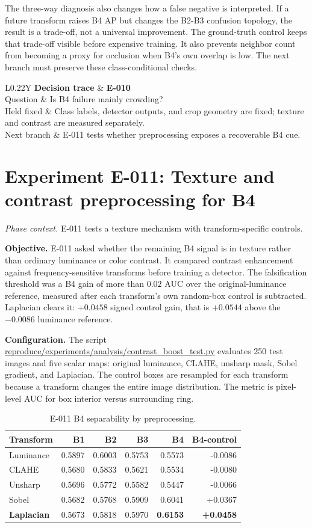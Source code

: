 \documentclass[preprint,12pt]{elsarticle}
\newcommand{\pathcode}[1]{\scriptsize\url{#1}}
\newcommand{\experiment}[2]{\par\medskip\Needspace{7\baselineskip}\section{Experiment #1: #2}}
\newcommand{\decisioncard}[4]{%
\begin{table}[H]\centering\small
\begin{tabularx}{\columnwidth}{L{0.22\columnwidth}Y}
\toprule
\textbf{Decision trace} & \textbf{#1}\\
Question & #2\\
Held fixed & #3\\
Next branch & #4\\
\bottomrule
\end{tabularx}
\end{table}}
\newcommand{\phasecontext}[1]{%
\par\smallskip\noindent\textit{Phase context.} #1\par\smallskip}
\begin{document}
The three-way diagnosis also changes how a false negative is interpreted. If a
future transform raises B4 AP but changes the B2-B3 confusion topology, the
result is a trade-off, not a universal improvement. The ground-truth control
keeps that trade-off visible before expensive training. It also prevents
neighbor count from becoming a proxy for occlusion when B4's own overlap is
low. The next branch must preserve these class-conditional checks.

\decisioncard{E-010}{Is B4 failure mainly crowding?}{Class labels, detector outputs, and crop geometry are fixed; texture and contrast are measured separately.}{E-011 tests whether preprocessing exposes a recoverable B4 cue.}
\experiment{E-011}{Texture and contrast preprocessing for B4}
\phasecontext{E-011 tests a texture mechanism with transform-specific controls.}
\textbf{Objective.} E-011 asked whether the remaining B4 signal is in texture
rather than ordinary luminance or color contrast. It compared contrast
enhancement against frequency-sensitive transforms before training a detector.
The falsification threshold was a B4 gain of more than \(0.02\) AUC over the
original-luminance reference, measured after each transform's own random-box
control is subtracted. Laplacian clears it: \(+0.0458\) signed control gain,
that is \(+0.0544\) above the \(-0.0086\) luminance reference.

\textbf{Configuration.} The script
\pathcode{reproduce/experiments/analysis/contrast_boost_test.py} evaluates
250 test images and five scalar maps: original luminance, CLAHE, unsharp
mask, Sobel gradient, and Laplacian. The control boxes are resampled for each
transform because a transform changes the entire image distribution. The
metric is pixel-level AUC for box interior versus surrounding ring.

\begin{table}[H]
\centering
\caption{E-011 B4 separability by preprocessing.}
\label{tab:e011}
\begin{tabular}{lrrrrr}
\toprule
Transform & B1 & B2 & B3 & B4 & B4-control\\
\midrule
Luminance & 0.5897 & 0.6003 & 0.5753 & 0.5573 & -0.0086\\
CLAHE & 0.5680 & 0.5833 & 0.5621 & 0.5534 & -0.0080\\
Unsharp & 0.5696 & 0.5772 & 0.5582 & 0.5447 & -0.0066\\
Sobel & 0.5682 & 0.5768 & 0.5909 & 0.6041 & +0.0367\\
\textbf{Laplacian} & 0.5673 & 0.5818 & 0.5970 & \textbf{0.6153} & \textbf{+0.0458}\\
\bottomrule
\end{tabular}
\end{table}
\end{document}
